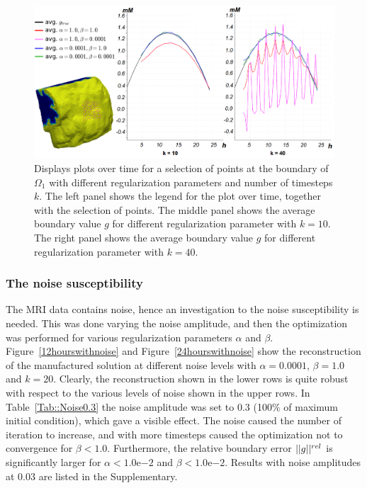\documentclass[12pt,a4paper]{article}
\begin{document}

\begin{figure}
\centering
\includegraphics[scale=0.21]{boundary_control.png}  
\caption{ Displays plots over time for a selection of points at the boundary of $\Omega_1$ with different regularization parameters and number of timesteps $k$. The left panel shows the legend for the plot over time, together with the selection of points. The middle panel shows the average boundary value $g$ for different regularization parameter with $k=10$. The right panel shows the average boundary value $g$ for different regularization parameter with $k=40$.  }
\label{boundarycontrol}
\end{figure}

\subsubsection{The noise susceptibility}
The MRI data contains noise, hence an investigation to the noise susceptibility is needed. This was done varying the noise amplitude, and then the optimization was performed for various regularization parameters $\alpha$ and $\beta$. Figure~\ref{12hourswithnoise} and Figure~\ref{24hourswithnoise} show the reconstruction of the manufactured solution at
different noise levels with $\alpha=0.0001$, $\beta=1.0$ and $k=20$. Clearly, the reconstruction shown in the lower rows is quite robust with respect to the various levels
of noise shown in the upper rows.      
In Table~\ref{Tab::Noise0.3} the noise amplitude was set to 0.3 (100$\%$ of maximum initial condition), which gave a visible effect. The noise caused the number of iteration to increase, and with more timesteps caused the optimization not to convergence for $\beta < 1.0$. Furthermore, the relative boundary error $||g||\sp{rel}$ is significantly larger for $\alpha< 1.0\mathrm{e}{-2} $ and $\beta < 1.0\mathrm{e}{-2}$. Results with noise  amplitudes at 0.03 are listed in the Supplementary. 
\end{document}
